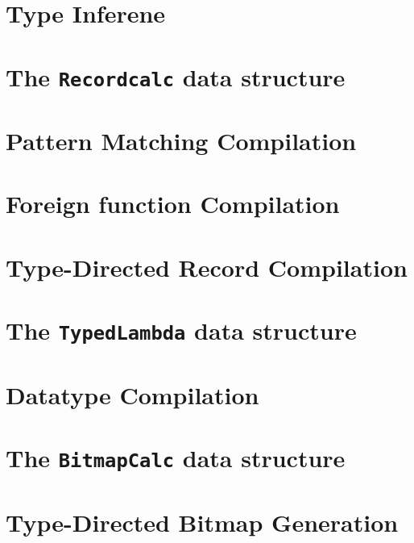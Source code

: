 \documentclass{jbook}
\newcommand{\txt}[2]{#2}
\newcommand{\code}[1]{\mbox{\large\tt #1}}
\begin{document}
\chapter{\txt
{型推論}
{Type Inferene}
}
\label{chap:typeinference}

\chapter{\txt
{\code{RecordCalc}データ構造}
{The \code{Recordcalc} data structure}
}
\label{chap:RecordCalc}

\chapter{\txt
{パターンマッチングコンパイル処理}
{Pattern Matching Compilation}
}
\label{chap:matchcompilation}

\chapter{\txt
{外部関数のコンパイル処理}
{Foreign function Compilation}
}
\label{chap:fficompilation}

\chapter{\txt
{型主導レコードコンパイル}
{Type-Directed Record Compilation}
}
\label{chap:recorcdcompilation}

\chapter{\txt
{\code{TypedLambda}データ構造}
{The \code{TypedLambda} data structure}
}
\label{chap:TypedLambda}

\chapter{\txt
{データ型のコンパイル}
{Datatype Compilation}
}
\label{chap:datatypecompilation}

\chapter{\txt
{\code{BitmapCalc}データ構造}
{The \code{BitmapCalc} data structure}
}
\label{chap:BitmapCalc}

\chapter{\txt
{型主導ビットマップ生成処理}
{Type-Directed Bitmap Generation}
}
\label{chap:bitmapgeneration}
\end{document}
